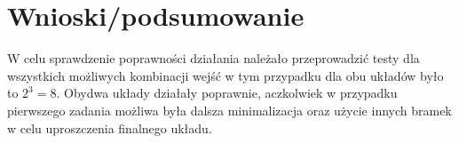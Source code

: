 \documentclass[12pt,a4paper]{article}
\begin{document}
	\section{Wnioski/podsumowanie}
	
	W celu sprawdzenie poprawności działania należało przeprowadzić testy dla wszystkich możliwych kombinacji wejść w tym przypadku dla obu układów było to $2^3 = 8$. Obydwa układy działały poprawnie, aczkolwiek w przypadku pierwszego zadania możliwa była dalsza minimalizacja oraz użycie innych bramek w celu uproszczenia finalnego układu. 
	
\end{document}
